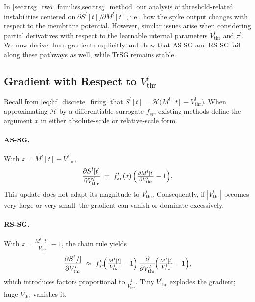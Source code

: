 In \cref{sec:trsg_two_families,sec:trsg_method} our analysis of threshold-related instabilities centered on $\partial S^{l}[t]/\partial M^{l}[t]$, i.e., how the spike output changes with respect to the membrane potential. However, similar issues arise when considering partial derivatives with respect to the learnable internal parameters $V^{l}_{\text{thr}}$ and $\tau^{l}$. We now derive these gradients explicitly and show that AS-SG and RS-SG fail along these pathways as well, while TrSG remains stable.

\subsection{Gradient with Respect to \texorpdfstring{$V^{l}_{\text{thr}}$}{V\_thr}}
\label{subsec:trsg_grad_vthr}

Recall from \cref{eq:lif_discrete_firing} that $S^{l}[t]=\mathcal{H}\!\bigl(M^{l}[t]-V^{l}_{\text{thr}}\bigr)$. When approximating $\mathcal{H}$ by a differentiable surrogate $f_{sr}$, existing methods define the argument $x$ in either absolute-scale or relative-scale form.

\paragraph{AS-SG.}
With $x = M^{l}[t]-V^{l}_{\text{thr}}$,
\begin{equation}
\frac{\partial S^{l}[t]}{\partial V^{l}_{\text{thr}}}
\;=\;
f_{sr}'(x)\,\Bigl(\tfrac{\partial M^{l}[t]}{\partial V^{l}_{\text{thr}}} - 1\Bigr).
\end{equation}
This update does not adapt its magnitude to $V^{l}_{\text{thr}}$. Consequently, if $|V^{l}_{\text{thr}}|$ becomes very large or very small, the gradient can vanish or dominate excessively.

\paragraph{RS-SG.}
With $x = \tfrac{M^{l}[t]}{V^{l}_{\text{thr}}}-1$, the chain rule yields
\begin{equation}
\frac{\partial S^{l}[t]}{\partial V^{l}_{\text{thr}}}
\;\approx\;
f_{sr}'\!\Bigl(\tfrac{M^{l}[t]}{V^{l}_{\text{thr}}}-1\Bigr)\,\frac{\partial}{\partial V^{l}_{\text{thr}}}\!\Bigl(\tfrac{M^{l}[t]}{V^{l}_{\text{thr}}}-1\Bigr),
\end{equation}
which introduces factors proportional to $\tfrac{1}{V^{l}_{\text{thr}}}$. Tiny $V^{l}_{\text{thr}}$ explodes the gradient; huge $V^{l}_{\text{thr}}$ vanishes it.

